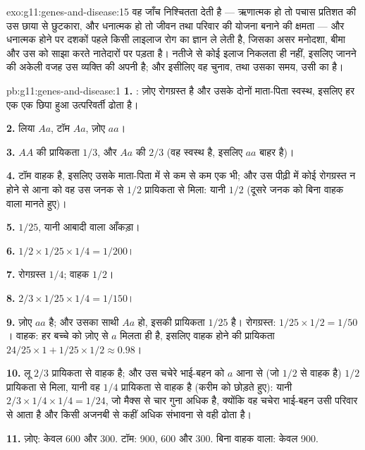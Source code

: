 \begin{solution}{exo:g11:genes-and-disease:15}
वह जाँच निश्चितता देती है --- ऋणात्मक हो तो पचास प्रतिशत की उस छाया से
छुटकारा, और धनात्मक हो तो जीवन तथा परिवार की योजना बनाने की क्षमता --- और
धनात्मक होने पर दशकों पहले किसी लाइलाज रोग का ज्ञान ले लेती है, जिसका असर
मनोदशा, बीमा और उस  को साझा करते नातेदारों पर पड़ता है। नतीजे से कोई
इलाज निकलता ही नहीं, इसलिए जानने की अकेली वजह उस व्यक्ति की अपनी है; और
इसीलिए वह चुनाव, तथा उसका समय, उसी का है।
\end{solution}

\begin{solution}{pb:g11:genes-and-disease:1}
\textbf{1.} : ज़ोए रोगग्रस्त है और उसके दोनों माता-पिता स्वस्थ,
इसलिए हर एक एक छिपा हुआ उत्परिवर्ती  ढोता है।

\textbf{2.} लिया $Aa$, टॉम $Aa$, ज़ोए $aa$।

\textbf{3.} $AA$ की प्रायिकता $1/3$, और $Aa$ की $2/3$ (वह स्वस्थ है,
इसलिए $aa$ बाहर है)।

\textbf{4.} टॉम वाहक है, इसलिए उसके माता-पिता में से कम से कम एक भी; और उस
पीढ़ी में कोई रोगग्रस्त न होने से आना को वह  उस जनक से $1/2$
प्रायिकता से मिला: यानी $1/2$ (दूसरे जनक को बिना वाहक वाला मानते हुए)।

\textbf{5.} $1/25$, यानी आबादी वाला आँकड़ा।

\textbf{6.} $1/2 \times 1/25 \times 1/4 = 1/200$।

\textbf{7.} रोगग्रस्त $1/4$; वाहक $1/2$।

\textbf{8.} $2/3 \times 1/25 \times 1/4 = 1/150$।

\textbf{9.} ज़ोए $aa$ है; और उसका साथी $Aa$ हो, इसकी प्रायिकता $1/25$ है।
रोगग्रस्त: $1/25 \times 1/2 = 1/50$। वाहक: हर बच्चे को ज़ोए से $a$ मिलता
ही है, इसलिए वाहक होने की प्रायिकता $24/25 \times 1 + 1/25 \times
1/2 \approx 0.98$।

\textbf{10.} लू $2/3$ प्रायिकता से वाहक है; और उस चचेरे भाई-बहन को $a$
आना से (जो $1/2$ से वाहक है) $1/2$ प्रायिकता से मिला, यानी वह
$1/4$ प्रायिकता से वाहक है (करीम को छोड़ते हुए): यानी $2/3 \times 1/4
\times 1/4 = 1/24$, जो मैक्स से चार गुना अधिक है, क्योंकि वह चचेरा
भाई-बहन उसी परिवार से आता है और किसी अजनबी से कहीं अधिक संभावना से वही
 ढोता है।

\textbf{11.} ज़ोए: केवल 600 और 300. टॉम: 900, 600 और 300. बिना वाहक वाला:
केवल 900.


\end{solution}
